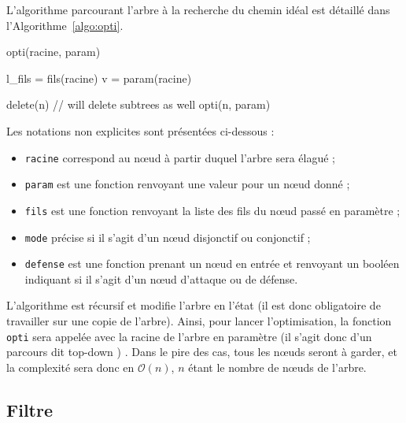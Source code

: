         L'algorithme parcourant l'arbre à la recherche du chemin idéal est détaillé dans l'Algorithme~\ref{algo:opti}.
        \begin{algorithm}[h!]
            \caption{opti(racine, param)}
            \label{algo:opti}
            \begin{algorithmic}
                \STATE l\_fils = fils(racine)
                    \RETURN
                \ENDIF
                \STATE
                    \STATE v = param(racine)

                            \STATE delete(n) // will delete subtrees as well
                        \ENDIF
                    \ENDFOR
                \ENDIF
                \STATE
                    \STATE opti(n, param)
                \ENDFOR
            \end{algorithmic}
        \end{algorithm}
        Les notations non explicites sont présentées ci-dessous :
        \begin{itemize}
            \item \verb|racine| correspond au nœud à partir duquel l'arbre sera élagué ;
            \item \verb|param| est une fonction renvoyant une valeur pour un nœud donné ;
            \item \verb|fils| est une fonction renvoyant la liste des fils du nœud passé en paramètre ;
            \item \verb|mode| précise si il s'agit d'un nœud disjonctif ou conjonctif ;
            \item \verb|defense| est une fonction prenant un nœud en entrée et renvoyant un booléen indiquant si il s'agit d'un nœud d'attaque ou de défense.
        \end{itemize}
        L'algorithme est récursif et modifie l'arbre en l'état (il est donc obligatoire de travailler sur une copie de l'arbre). 
        Ainsi, pour lancer l'optimisation, la fonction \verb|opti| sera appelée avec la racine de l'arbre en paramètre (il s'agit donc d'un parcours dit \og top-down \fg) . Dans le pire des cas, tous les nœuds seront à garder, et la complexité sera donc en $\mathcal{O}(n)$, $n$ étant le nombre de nœuds de l'arbre.

    \subsection{Filtre}
        \label{subsection:filtre} 

